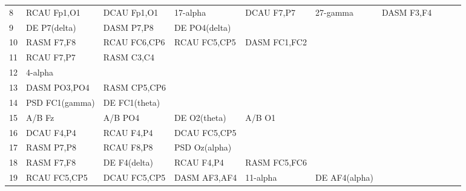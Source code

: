 \begin{landscape}
\begin{table}[]
\begin{tabular}{l|llllllll}
8        & RCAU Fp1,O1    & DCAU Fp1,O1    & 17-alpha       & DCAU F7,P7     & 27-gamma       & DASM F3,F4     &                &                &               &              \\
9        & DE P7(delta)   & DASM P7,P8     & DE PO4(delta)  &                &                &                &                &                &               &              \\
10       & RASM F7,F8     & RCAU FC6,CP6   & RCAU FC5,CP5   & DASM FC1,FC2   &                &                &                &                &               &              \\
11       & RCAU F7,P7     & RASM C3,C4     &                &                &                &                &                &                &               &              \\
12       & 4-alpha        &                &                &                &                &                &                &                &               &              \\
13       & DASM PO3,PO4   & RASM CP5,CP6   &                &                &                &                &                &                &               &              \\
14       & PSD FC1(gamma) & DE FC1(theta)  &                &                &                &                &                &                &               &              \\
15       & A/B Fz         & A/B PO4        & DE O2(theta)   & A/B O1         &                &                &                &                &               &              \\
16       & DCAU F4,P4     & RCAU F4,P4     & DCAU FC5,CP5   &                &                &                &                &                &               &              \\
17       & RASM P7,P8     & RCAU F8,P8     & PSD Oz(alpha)  &                &                &                &                &                &               &              \\
18       & RASM F7,F8     & DE F4(delta)   & RCAU F4,P4     & RASM FC5,FC6   &                &                &                &                &               &              \\
19       & RCAU FC5,CP5   & DCAU FC5,CP5   & DASM AF3,AF4   & 11-alpha       & DE AF4(alpha)  &                &                &                &               &              \\

\end{tabular}
\end{table}
\end{landscape}
